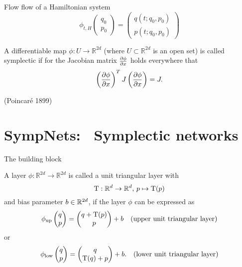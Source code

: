 \begin{frame}{Flow}
  flow of a Hamiltonian system
  \begin{equation*}
    \phi_{t,H}\begin{pmatrix}
      q_0 \\
      p_0
    \end{pmatrix}
    = \begin{pmatrix}
      q(t; q_0, p_0) \\
      p(t; q_0, p_0)
    \end{pmatrix}
  \end{equation*}

  \begin{definition}
    A differentiable map $\phi : U \to \mathbb{R}^{2d}$ (where $U \subset \mathbb{R}^{2d}$ is an open set)
    is called symplectic if for the Jacobian matrix $\frac{\partial \phi}{\partial x}$ holds everywhere that
    \begin{equation*}
      \left( \frac{\partial \phi}{\partial x} \right)^T J \left( \frac{\partial \phi}{\partial x} \right) = J
      .
    \end{equation*}
  \end{definition}

   (Poincaré 1899)
\end{frame}

\section{SympNets: ~\newline Symplectic networks}

\begin{frame}{The building block}
  \begin{definition}
    A layer $\phi : \mathbb{R}^{2d} \to \mathbb{R}^{2d}$ 
    is called a unit triangular layer with 
    \begin{equation*}
      \mathrm{T} : \mathbb{R}^d \to \mathbb{R}^d,\, p \mapsto \mathrm{T}(p)
    \end{equation*}
    and bias parameter $b \in \mathbb{R}^{2d}$, if the layer $\phi$ can be expressed as
    \begin{equation*}
      \phi_{\text{up}} \begin{pmatrix} q \\ p \end{pmatrix}
      = \begin{pmatrix}
        q + \mathrm{T}(p) \\
        p
      \end{pmatrix} + b \quad \text{(upper unit triangular layer)}
    \end{equation*}
    or
    \begin{equation*}
      \phi_{\text{low}} \begin{pmatrix} q \\ p \end{pmatrix}
      = \begin{pmatrix}
        q \\
        \mathrm{T}(q) + p
      \end{pmatrix} + b. \quad \text{(lower unit triangular layer)}
    \end{equation*}
  \end{definition}

\end{frame}

